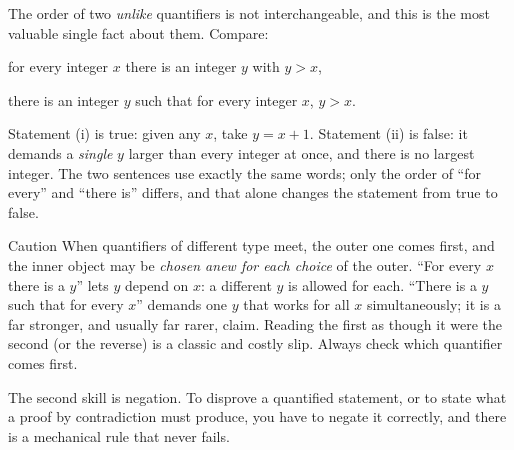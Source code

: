 \documentclass[a4paper,12pt,oneside]{memoir}
\begin{document}
The order of two \emph{unlike} quantifiers is not interchangeable, and this is the most valuable single fact about them. Compare:

\begin{romanlist}
  \item for every integer \(x\) there is an integer \(y\) with \(y > x\),
  \item there is an integer \(y\) such that for every integer \(x\), \(y > x\).
\end{romanlist}
Statement (i) is true: given any \(x\), take \(y = x + 1\). Statement (ii) is false: it demands a \emph{single} \(y\) larger than every integer at once, and there is no largest integer. The two sentences use exactly the same words; only the order of “for every” and “there is” differs, and that alone changes the statement from true to false.

\begin{envcaution}{Caution}{}{}
When quantifiers of different type meet, the outer one comes first, and the inner object may be \emph{chosen anew for each choice} of the outer. “For every \(x\) there is a \(y\)” lets \(y\) depend on \(x\): a different \(y\) is allowed for each. “There is a \(y\) such that for every \(x\)” demands one \(y\) that works for all \(x\) simultaneously; it is a far stronger, and usually far rarer, claim. Reading the first as though it were the second (or the reverse) is a classic and costly slip. Always check which quantifier comes first.
\end{envcaution}
The second skill is negation. To disprove a quantified statement, or to state what a proof by contradiction must produce, you have to negate it correctly, and there is a mechanical rule that never fails.
\end{document}
